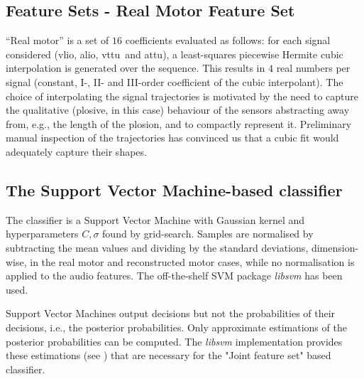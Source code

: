 \documentclass[10pt]{article}
\newcommand{\vlio}{\textsf{vlio}}
\newcommand{\vttu}{\textsf{vttu}}
\newcommand{\alio}{\textsf{alio}}
\newcommand{\attu}{\textsf{attu}}
\begin{document}
\subsection{Feature Sets - Real Motor Feature Set}
``Real motor'' is a set of $16$ coefficients evaluated as follows: for each
signal considered (\vlio, \alio, \vttu\ and \attu), a least-squares piecewise
Hermite cubic interpolation is generated over the sequence. This results in $4$ real
numbers per signal (constant, I-, II- and III-order coefficient of the cubic
interpolant). The choice of interpolating the signal trajectories is motivated by
the need to capture the qualitative (plosive, in this case) behaviour of the sensors
abstracting away from, e.g., the length of the plosion, and to compactly represent it.
Preliminary manual inspection of the trajectories has convinced us that a cubic fit
would adequately capture their shapes.

\subsection{The Support Vector Machine-based classifier}
The classifier is a Support Vector Machine \cite{BGV92} with Gaussian kernel
and hyperparameters $C, \sigma$ found by grid-search. Samples are normalised
by subtracting the mean values and dividing by the standard deviations,
dimension-wise, in the real motor and reconstructed motor cases, while
no normalisation is applied to the audio features. The off-the-shelf SVM
package \emph{libsvm} \cite{libsvm} has been used.

Support Vector Machines output decisions but not the probabilities of their 
decisions, i.e., the posterior probabilities. Only approximate estimations of 
the posterior probabilities can be computed. The \emph{libsvm} implementation provides these
estimations (see \cite{libsvm}) that are necessary for the "Joint feature set" based classifier.
\end{document}
